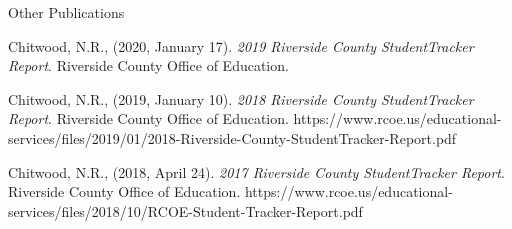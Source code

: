 

\begin{cventries}

  \cventry
    {Other Publications} %
    {} %
    {} %
    {} %
    {
      \begin{cvitems-apa} %
        \item {Chitwood, N.R., (2020, January 17). \textit{2019 Riverside County StudentTracker Report}. Riverside County Office of Education.}
        \item {Chitwood, N.R., (2019, January 10). \textit{2018 Riverside County StudentTracker Report}. Riverside County Office of Education. https://www.rcoe.us/educational-services/files/2019/01/2018-Riverside-County-StudentTracker-Report.pdf}
        \item {Chitwood, N.R., (2018, April 24). \textit{2017 Riverside County StudentTracker Report}. Riverside County Office of Education. https://www.rcoe.us/educational-services/files/2018/10/RCOE-Student-Tracker-Report.pdf}
      \end{cvitems-apa}
    }


\end{cventries}
